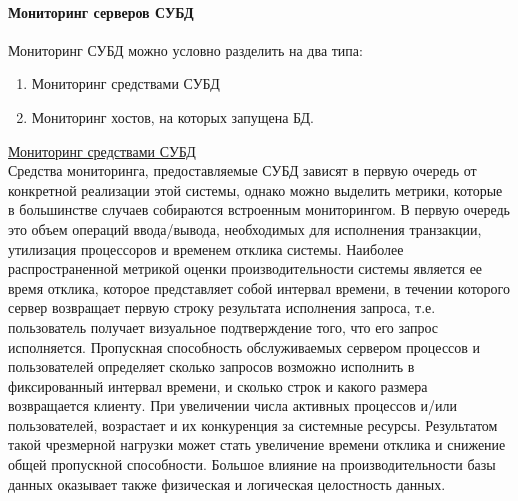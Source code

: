 \paragraph{Мониторинг серверов СУБД}
Мониторинг СУБД можно условно разделить на два типа:
\begin{enumerate}
    \item Мониторинг средствами СУБД
    \item Мониторинг хостов, на которых запущена БД.
\end{enumerate}
\underline{Мониторинг средствами СУБД} \\ Средства мониторинга, предоставляемые СУБД зависят в первую очередь от конкретной реализации этой системы, однако можно выделить метрики, которые в большинстве случаев собираются встроенным мониторингом. В первую очередь это объем операций ввода/вывода, необходимых для исполнения транзакции, утилизация процессоров и временем отклика системы. Наиболее распространенной метрикой оценки производительности системы является ее время отклика, которое представляет собой интервал времени, в течении которого сервер возвращает первую строку результата исполнения запроса, т.е. пользователь получает визуальное подтверждение того, что его запрос исполняется. Пропускная способность обслуживаемых сервером процессов и пользователей определяет сколько запросов возможно исполнить в фиксированный интервал времени, и сколько строк и какого размера возвращается клиенту. При увеличении числа активных процессов и/или пользователей, возрастает и их конкуренция за системные ресурсы. Результатом такой чрезмерной нагрузки может стать увеличение времени отклика и снижение общей пропускной способности. Большое влияние на производительности базы данных оказывает также физическая и логическая целостность данных. \\

